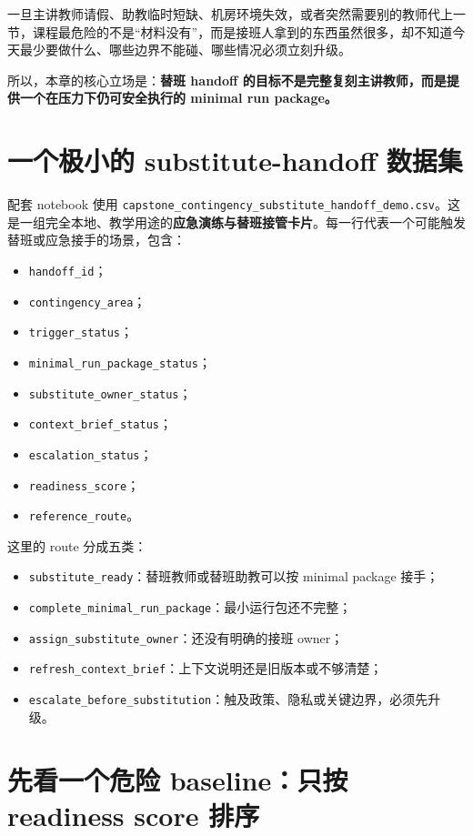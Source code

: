 一旦主讲教师请假、助教临时短缺、机房环境失效，或者突然需要别的教师代上一节，课程最危险的不是“材料没有”，而是接班人拿到的东西虽然很多，却不知道今天最少要做什么、哪些边界不能碰、哪些情况必须立刻升级。

所以，本章的核心立场是：\textbf{替班 handoff 的目标不是完整复刻主讲教师，而是提供一个在压力下仍可安全执行的 minimal run package。}

\section{一个极小的 substitute-handoff 数据集}

配套 notebook 使用 \nolinkurl{capstone_contingency_substitute_handoff_demo.csv}。这是一组完全本地、教学用途的\textbf{应急演练与替班接管卡片}。每一行代表一个可能触发替班或应急接手的场景，包含：

\begin{itemize}
    \item \texttt{handoff\_id}；
    \item \texttt{contingency\_area}；
    \item \texttt{trigger\_status}；
    \item \texttt{minimal\_run\_package\_status}；
    \item \texttt{substitute\_owner\_status}；
    \item \texttt{context\_brief\_status}；
    \item \texttt{escalation\_status}；
    \item \texttt{readiness\_score}；
    \item \texttt{reference\_route}。
\end{itemize}

这里的 route 分成五类：

\begin{itemize}
    \item \texttt{substitute\_ready}：替班教师或替班助教可以按 minimal package 接手；
    \item \texttt{complete\_minimal\_run\_package}：最小运行包还不完整；
    \item \texttt{assign\_substitute\_owner}：还没有明确的接班 owner；
    \item \texttt{refresh\_context\_brief}：上下文说明还是旧版本或不够清楚；
    \item \texttt{escalate\_before\_substitution}：触及政策、隐私或关键边界，必须先升级。
\end{itemize}

\section{先看一个危险 baseline：只按 readiness score 排序}

